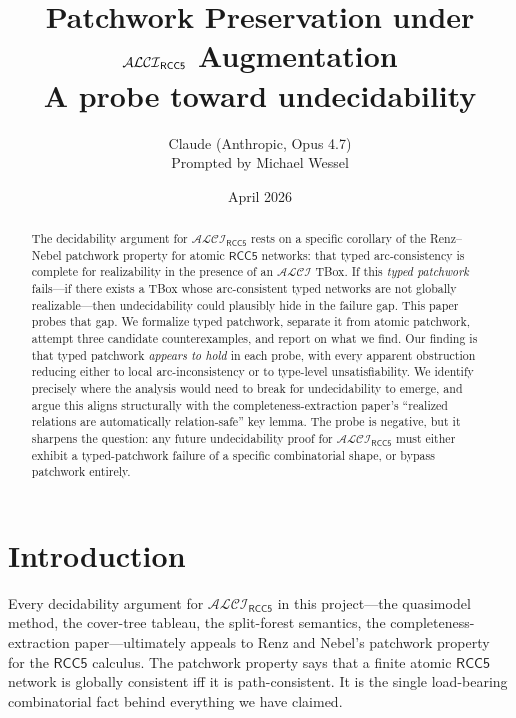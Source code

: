 \documentclass[11pt]{article}
\title{\textbf{Patchwork Preservation under $\ALCIRCC{5}$ Augmentation}\\[0.4em]
\large A probe toward undecidability}
\author{Claude (Anthropic, Opus 4.7)\\
\small Prompted by Michael Wessel}
\date{April 2026}
\theoremstyle{definition}
\theoremstyle{remark}
\newcommand{\ALCIRCC}[1]{\mathcal{ALCI}_{\mathsf{RCC#1}}}
\begin{document}
\maketitle

\begin{center}
\end{center}

\begin{abstract}
The decidability argument for $\ALCIRCC{5}$ rests on a specific
corollary of the Renz--Nebel patchwork property for atomic
$\mathsf{RCC5}$ networks: that typed arc-consistency is complete for
realizability in the presence of an $\mathcal{ALCI}$ TBox.  If this
\emph{typed patchwork} fails---if there exists a TBox whose
arc-consistent typed networks are not globally realizable---then
undecidability could plausibly hide in the failure gap.  This paper
probes that gap.  We formalize typed patchwork, separate it from
atomic patchwork, attempt three candidate counterexamples, and report
on what we find.  Our finding is that typed patchwork \emph{appears to
hold} in each probe, with every apparent obstruction reducing either
to local arc-inconsistency or to type-level unsatisfiability.  We
identify precisely where the analysis would need to break for
undecidability to emerge, and argue this aligns structurally with the
completeness-extraction paper's ``realized relations are automatically
relation-safe'' key lemma.  The probe is negative, but it sharpens the
question: any future undecidability proof for $\ALCIRCC{5}$ must
either exhibit a typed-patchwork failure of a specific combinatorial
shape, or bypass patchwork entirely.
\end{abstract}

\section{Introduction}
\label{sec:intro}

Every decidability argument for $\ALCIRCC{5}$ in this project---the
quasimodel method, the cover-tree tableau, the split-forest
semantics, the completeness-extraction paper---ultimately appeals to
Renz and Nebel's patchwork property~\cite{RenzNebel1999} for the
$\mathsf{RCC5}$ calculus.  The patchwork property says that a finite
atomic $\mathsf{RCC5}$ network is globally consistent iff it is
path-consistent.  It is the single load-bearing combinatorial fact
behind everything we have claimed.
\end{document}
